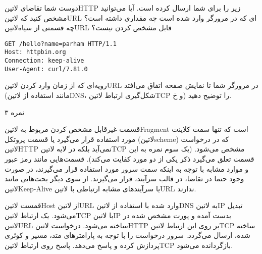 \documentclass[../main.tex]{subfiles}
\begin{document}

دوست شما تقاضای ‌لاتین{HTTP} زیر را برای شما ارسال کرده است.
آیا می‌توانید مشخص کنید که ‌لاتین{URL} ای که در مرورگر وارد شده است چه مقداری داشته است؟
چه قسمتی از ‌سیاه{‌لاتین{URL}} قابل مشخص کردن نیست؟

\begin{latin}
\begin{verbatim}
GET /hello?name=parham HTTP/1.1
Host: httpbin.org
Connection: keep-alive
User-Agent: curl/7.81.0
\end{verbatim}
\end{latin}

رویه‌ای که از زمان وارد کردن ‌لاتین{URL} در مرورگر شما تا نمایش صفحه اتفاق می‌افتد (مانند استفاده از ‌لاتین{DNS}، شکل‌گیری ارتباط ‌لاتین{TCP} و ‌خ) را توضیح دهید.

۳ نمره

\begin{answer}

قسمت غیرقابل مشخص کردن مربوط به ‌لاتین{Fragment} است که تنها سمت کلاینت مورد استفاده قرار می‌گیرد
یا قسمت پروتکل (‌لاتین{scheme}) که در درخواست ‌لاتین{HTTP} نمی‌آید بلکه در لایه ‌لاتین{TCP} مشخص می‌شود.
(یک سوم نمره به این قسمت تعلق می‌گیرد ذکر یکی از دو مورد کفایت می‌کند).
قسمت‌هایی مانند رمز عبور و موارد مشابه با توجه به اینکه سمت سرور مورد استفاده قرار می‌گیرند، در صورت وجود حتما در تقاضا،
در قالب سرآیند، قرار می‌گیرند.
از سوی دیگر بحث‌هایی مانند ‌لاتین{Keep-Alive} یا سرآیندهای مشابه ارتباطی با ‌لاتین{URL} ندارند.

 قمست ‌لاتین{Host} از ‌لاتین{URL} وارد شده با استفاده از ‌لاتین{DNS} به ‌لاتین{IP} تبدیل می‌شود.
 یک ارتباط ‌لاتین{TCP} با ‌لاتین{IP} بدست آمده و پورت مشخص شده در ‌لاتین{URL} ساخته می‌شود.
 درخواست ‌لاتین{HTTP} بر روی این ارتباط ‌لاتین{TCP} ساخته شده، ارسال می‌گردد.
 سرور درخواست را با توجه به پارامترهای متد، مسیر و کوئری پردازش کرده و پاسخ می‌دهد.
 پاسخ روی ارتباط ‌لاتین{TCP} بازگردانده می‌شود.

\end{answer}
\end{document}
